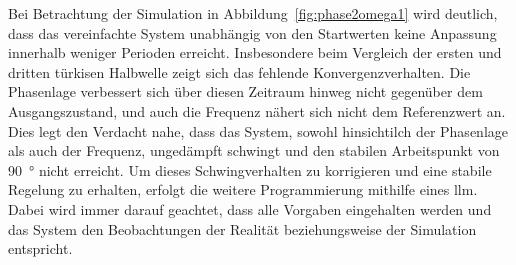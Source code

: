 \documentclass[../main.tex]{subfiles}
\begin{document}
Bei Betrachtung der Simulation in Abbildung~\ref{fig:phase2omega1} wird deutlich, dass das vereinfachte System unabhängig von den Startwerten keine Anpassung innerhalb weniger Perioden erreicht. Insbesondere beim Vergleich der ersten und dritten türkisen Halbwelle zeigt sich das fehlende Konvergenzverhalten. Die Phasenlage verbessert sich über diesen Zeitraum hinweg nicht gegenüber dem Ausgangszustand, und auch die Frequenz nähert sich nicht dem Referenzwert an. Dies legt den Verdacht nahe, dass das System, sowohl hinsichtilch der Phasenlage als auch der Frequenz, ungedämpft schwingt und den stabilen Arbeitspunkt von \SI{90}{\degree} nicht erreicht. Um dieses Schwingverhalten zu korrigieren und eine stabile Regelung zu erhalten, erfolgt die weitere Programmierung mithilfe eines \gls{llm}. Dabei wird immer darauf geachtet, dass alle Vorgaben eingehalten werden und das System den Beobachtungen der Realität beziehungsweise der Simulation entspricht.\par
\medskip
\end{document}

